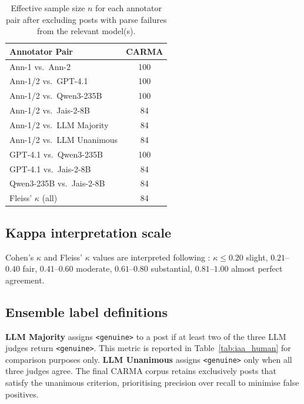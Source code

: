 \documentclass[11pt]{article}
\begin{document}
\begin{table}[h]
\centering
\small
\begin{tabular}{lc}
\toprule
\textbf{Annotator Pair} & \textbf{CARMA} \\
\midrule
Ann-1 vs.\ Ann-2          & 100 \\
\midrule
Ann-1/2 vs.\ GPT-4.1      & 100 \\
Ann-1/2 vs.\ Qwen3-235B   & 100 \\
Ann-1/2 vs.\ Jais-2-8B    &  84 \\
Ann-1/2 vs.\ LLM Majority &  84 \\
Ann-1/2 vs.\ LLM Unanimous&  84 \\
\midrule
GPT-4.1 vs.\ Qwen3-235B   & 100 \\
GPT-4.1 vs.\ Jais-2-8B    &  84 \\
Qwen3-235B vs.\ Jais-2-8B &  84 \\
\midrule
Fleiss' $\kappa$ (all)     &  84 \\
\bottomrule
\end{tabular}
\caption{Effective sample size $n$ for each annotator pair after
excluding posts with parse failures from the relevant model(s).}
\label{tab:sample_sizes}
\end{table}

\subsection*{Kappa interpretation scale}

Cohen's $\kappa$ and Fleiss' $\kappa$ values are interpreted following
\citet{landis1977measurement}: $\kappa \leq 0.20$ slight,
$0.21$--$0.40$ fair, $0.41$--$0.60$ moderate, $0.61$--$0.80$
substantial, $0.81$--$1.00$ almost perfect agreement.

\subsection*{Ensemble label definitions}

\textbf{LLM Majority} assigns \texttt{<genuine>} to a post if at least
two of the three LLM judges return \texttt{<genuine>}. This metric is
reported in Table~\ref{tab:iaa_human} for comparison purposes only.
\textbf{LLM Unanimous} assigns \texttt{<genuine>} only when all three
judges agree. The final CARMA corpus retains exclusively
posts that satisfy the unanimous criterion, prioritising precision over
recall to minimise false positives.
\end{document}
